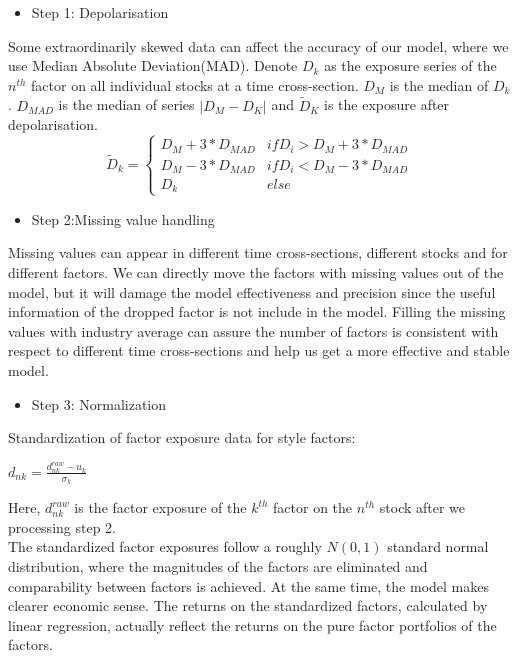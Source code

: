 \documentclass[10pt]{article}
\begin{document}
\begin{itemize}
    \item Step 1: Depolarisation
\end{itemize}

Some extraordinarily skewed data can affect the accuracy of our model, where we use Median Absolute Deviation(MAD). Denote $D_k$ as the exposure series of the $n^{th}$ factor on all individual stocks at a time cross-section. $D_M$ is the median of $D_k$. $D_{MAD}$ is the median of series $|D_M-D_K|$ and $\widetilde D_K$ is the exposure after depolarisation. 
\begin{equation}
    \widetilde D_k=
\left \{
    \begin{array}{lr}
    D_M+3*D_{MAD}     & if D_i>D_M+3*D_{MAD} \\
    D_M-3*D_{MAD}     & if D_i<D_M-3*D_{MAD} \\
    D_k &else
    \end{array} 
\right.
\end{equation}

\begin{itemize}
    \item Step 2:Missing value handling
\end{itemize}

Missing values can appear in different time cross-sections, different stocks and for different factors. We can directly move the factors with missing values out of the model, but it will damage the model effectiveness and precision since the useful information of the dropped factor is not include in the model. Filling the missing values with industry average can assure the number of factors is consistent with respect to different time cross-sections and help us get a more effective and stable model.

\begin{itemize}
    \item Step 3: Normalization
\end{itemize}

Standardization of factor exposure data for style factors:
\begin{center}
    $d_{nk}=\frac{d_{nk}^{raw}-u_k}{\sigma_k}$
\end{center}
Here, $d_{nk}^{raw}$ is the factor exposure of the $k^{th}$ factor on the $n^{th}$ stock after we processing step 2. \\
The standardized factor exposures follow a roughly $N(0,1)$ standard normal distribution, where the magnitudes of the factors are eliminated and comparability between factors is achieved. At the same time, the model makes clearer economic sense. The returns on the standardized factors, calculated by linear regression, actually reflect the returns on the pure factor portfolios of the factors.
\end{document}
